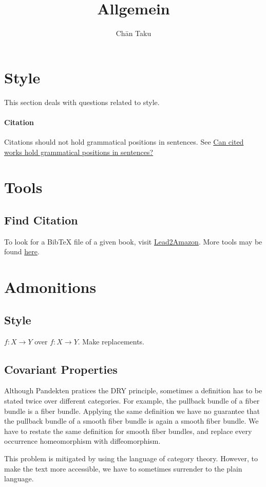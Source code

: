 \documentclass{article}
\title{Allgemein}
\author{Ch\=an Taku}
\begin{document}
\maketitle

\section{Style}

This section deals with questions related to style.

\paragraph{Citation}
Citations should not hold grammatical positions in sentences.
See \href{https://academia.stackexchange.com/questions/49487/can-cited-works-hold-grammatical-positions-in-sentences}{Can cited works hold grammatical positions in sentences?}

\section{Tools}

\subsection{Find Citation}

To look for a BibTeX file of a given book, visit \href{https://lead.to/amazon/com/?key=978-0199566402&si=al&bn=&la=en&cu=usd&op=bt&so=re#first}{Lead2Amazon}.
More tools may be found \href{https://tex.stackexchange.com/questions/58200/what-is-the-best-way-to-get-bibtex-entries-from-isbn-number}{here}.

\section{Admonitions}

\subsection{Style}

$f\colon X \to Y$ over $f: X\rightarrow Y$. Make replacements.

\subsection{Covariant Properties}

Although Pandekten pratices the DRY principle,
sometimes a definition has to be stated twice over different categories.
For example, the pullback bundle of a fiber bundle is a fiber bundle.
Applying the same definition we have no guarantee that the pullback bundle of a smooth fiber bundle is again a smooth fiber bundle.
We have to restate the same definition for smooth fiber bundles, and replace every occurrence homeomorphism with diffeomorphism.
\par
This problem is mitigated by using the language of category theory.
However, to make the text more accessible, we have to sometimes surrender to the plain language.
\end{document}
